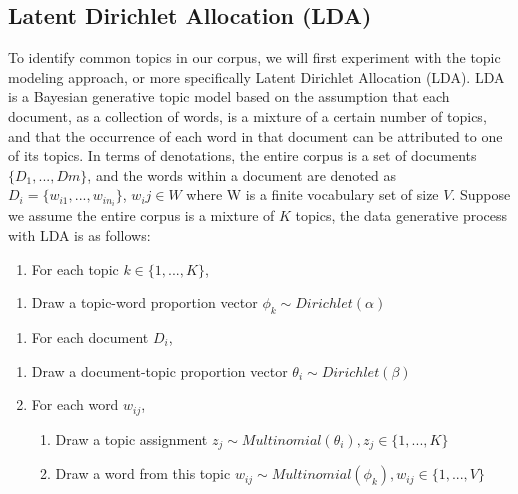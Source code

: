 \documentclass[12pt,twoside]{dukestatscithesis}
\providecommand{\tightlist}{%
  \setlength{\itemsep}{0pt}\setlength{\parskip}{0pt}}
\theoremstyle{definition}
\theoremstyle{definition}
\theoremstyle{definition}
\theoremstyle{remark}
\begin{document}
\subsection{Latent Dirichlet Allocation
(LDA)}\label{latent-dirichlet-allocation-lda}

To identify common topics in our corpus, we will first experiment with
the topic modeling approach, or more specifically Latent Dirichlet
Allocation (LDA). LDA is a Bayesian generative topic model based on the
assumption that each document, as a collection of words, is a mixture of
a certain number of topics, and that the occurrence of each word in that
document can be attributed to one of its topics. In terms of
denotations, the entire corpus is a set of documents
\(\{D_1, ..., Dm\}\), and the words within a document are denoted as
\(D_i=\{w_{i1},...,w_{in_i}\}\), \(w_ij \in W\) where W is a finite
vocabulary set of size \(V\). Suppose we assume the entire corpus is a
mixture of \(K\) topics, the data generative process with LDA is as
follows:
\begin{enumerate}
\def\labelenumi{\arabic{enumi}.}
\tightlist
\item
  For each topic \(k \in \{1,...,K\}\),\\
\end{enumerate}
\begin{enumerate}
\def\labelenumi{\alph{enumi}.}
\tightlist
\item
  Draw a topic-word proportion vector
  \(\phi_k \sim Dirichlet(\alpha)\)\\
\end{enumerate}
\begin{enumerate}
\def\labelenumi{\arabic{enumi}.}
\setcounter{enumi}{1}
\tightlist
\item
  For each document \(D_i\),
\end{enumerate}
\begin{enumerate}
\def\labelenumi{\alph{enumi}.}
\tightlist
\item
  Draw a document-topic proportion vector
  \(\theta_i \sim Dirichlet(\beta)\)\\
\item
  For each word \(w_{ij}\),
  \begin{enumerate}
  \def\labelenumii{\roman{enumii}.}
  \tightlist
  \item
    Draw a topic assignment
    \(z_j \sim Multinomial(\theta_i), z_j \in \{1,...,K\}\)\\
  \item
    Draw a word from this topic
    \(w_{ij} \sim Multinomial(\phi_k), w_{ij} \in \{1,...,V\}\)
  \end{enumerate}
\end{enumerate}
\end{document}
